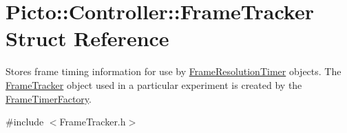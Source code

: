 \hypertarget{struct_picto_1_1_controller_1_1_frame_tracker}{\section{Picto\-:\-:Controller\-:\-:Frame\-Tracker Struct Reference}
\label{struct_picto_1_1_controller_1_1_frame_tracker}
}


Stores frame timing information for use by \hyperlink{class_picto_1_1_controller_1_1_frame_resolution_timer}{Frame\-Resolution\-Timer} objects. The \hyperlink{struct_picto_1_1_controller_1_1_frame_tracker}{Frame\-Tracker} object used in a particular experiment is created by the \hyperlink{class_picto_1_1_controller_1_1_frame_timer_factory}{Frame\-Timer\-Factory}.  




{\ttfamily \#include $<$Frame\-Tracker.\-h$>$}

